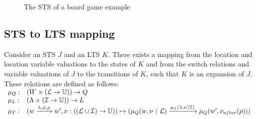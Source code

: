 \begin{figure}[ht]
  \begin{center}
    
  \end{center}
  \caption{The STS of a board game example}
  \label{fig:example_sts}
\end{figure}

\subsection{STS to LTS mapping}\label{sec:sts_lts_trafo}
Consider an STS $J$ and an LTS $K$. There exists a mapping from the location and location variable valuations to the states of $K$ and from the switch relations and variable valuations of $J$ to the transitions of $K$, such that $K$ is an expansion of $J$. These relations are defined as follows:
$\begin{array}{ll}
\mu_Q: & (W \times (\mathcal{L} \rightarrow \mathbb{U})) \rightarrow Q \\
\mu_L: & (\Lambda \times (\mathcal{I} \rightarrow \mathbb{U})) \rightarrow L \\
\mu_T: & (w\xrightarrow{\lambda,\phi,\rho}w', \nu: ((\mathcal{L} \cup \mathcal{I}) \rightarrow \mathbb{U})) \mapsto (\mu_Q(w, \nu \restriction \mathcal{L}) \xrightarrow{\mu_L(\lambda, \nu \restriction\mathcal{I})} \mu_Q(w', \nu_{after}(\rho)))
\end{array}$

\begin{comment}
These relations are constructed as follows: for a switch relation $r$ from location $A$ to location $B$, a valuation of the location variables $\nu_l$ and interaction variables $\nu_i$, $\mu_l:(A,\nu_l)$ maps to a state $q$, where $q$ is the source state of a transition $t$, if the result of the valuation $\nu:(\phi$ of $r, \nu_l \cup \nu_i)$ is true. $\nu_{l_new}$ is the new valuation of the location variables constructed by the valuation of $\rho$ of $r$. Then, the target state $q'$ of $t$ is the state mapped by $\mu_l:(B,\nu_{l_new}$). The label of $t$ is a textual representation of $\Gates$ of $r$ and $\nu_i$. Applying this rule for the topology to all locations, switch relations and concrete values for the variables, results in $L$. The start state $q0$ of $L$ is the state mapped by $\mu_l:(l_0,\initializationFunction)$. All states not reachable from $q0$ are removed from $L$.
\end{comment}

